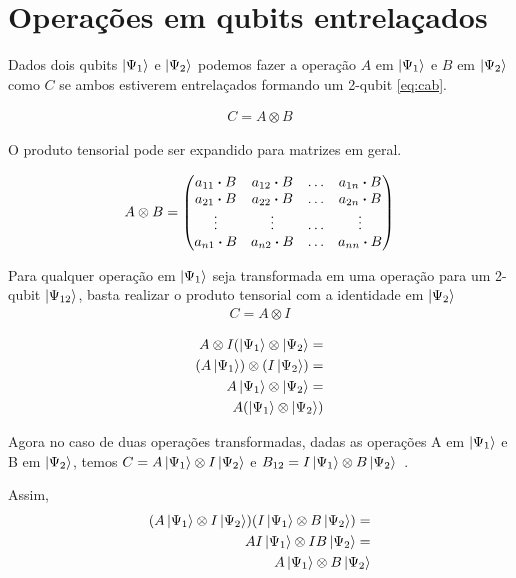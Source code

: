 \documentclass[a4paper, 12pt, oneside]{book}
\begin{document}
\section{Operações em qubits entrelaçados}

Dados dois qubits $\ket{\Psi_1}$ e $\ket{\Psi_2}$ podemos fazer a operação $A$ em $\ket{\Psi_1}$ e $B$ em $\ket{\Psi_2}$ como $C$ se ambos estiverem entrelaçados formando um 2-qubit \eqref{eq:cab}.

\begin{align} \label{eq:cab}
C = A \otimes B
\end{align}

O produto tensorial pode ser expandido para matrizes em geral.

\begin{align*}
A \otimes B = \mqty(a_{11}\vdot B & a_{12}\vdot B & \hdots & a_{1n}\vdot B \\
  a_{21}\vdot B & a_{22}\vdot B & \hdots & a_{2n}\vdot B \\
  \vdots & \vdots & \hdots & \vdots \\
  a_{n1}\vdot B & a_{n2}\vdot B & \hdots & a_{nn}\vdot B \\
)
\end{align*}

Para qualquer operação em $\ket{\Psi_1}$ seja transformada em uma operação para um 2-qubit $\ket{\Psi_{12}}$, basta realizar o produto tensorial com a identidade em $\ket{\Psi_2}$ 
\begin{align} \label{eq:cai}
C = A \otimes I
\end{align}

\begin{align*}
A \otimes I (\ket{\Psi_1} \otimes \ket{\Psi_2} = \\
  (A\ket{\Psi_1}) \otimes (I\ket{\Psi_2}) = \\
  A\ket{\Psi_1} \otimes \ket{\Psi_2} = \\
  A(\ket{\Psi_1} \otimes \ket{\Psi_2})
\end{align*}

Agora no caso de duas operações transformadas, dadas as operações A em $\ket{\Psi_1}$ e B em $\ket{\Psi_2}$, temos $C = A\ket{\Psi_1} \otimes I\ket{\Psi_2}$ e $B_{12} = I\ket{\Psi_1} \otimes B\ket{\Psi_2}$~\cite{mermin}.

Assim,
\begin{align*}
(A\ket{\Psi_1} \otimes I\ket{\Psi_2})(I\ket{\Psi_1} \otimes B\ket{\Psi_2}) = \\
AI\ket{\Psi_1} \otimes IB\ket{\Psi_2} = \\
A\ket{\Psi_1} \otimes B\ket{\Psi_2}
\end{align*}
\end{document}
